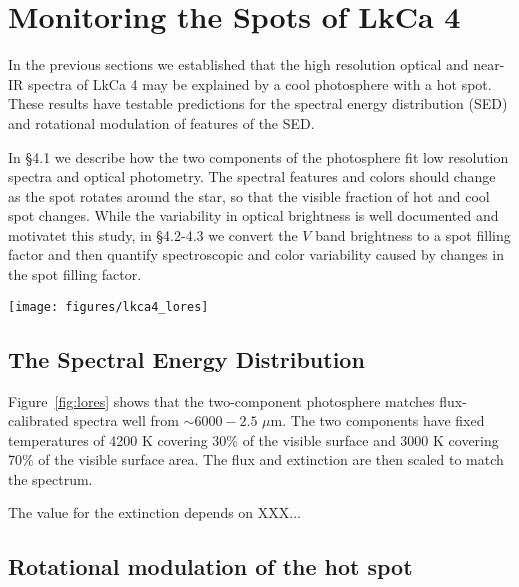 \documentclass[twocolumn]{emulateapj}%
\begin{document}




\section{Monitoring the Spots of LkCa 4}

In the previous sections we established that the high resolution optical and near-IR spectra of LkCa 4 may be explained by a cool photosphere with a hot spot.  These results have testable predictions for the spectral energy distribution (SED) and rotational modulation of features of the SED.


In \S 4.1 we describe how the two components of the photosphere fit low resolution spectra and optical photometry.  The spectral features and colors should change as the spot rotates around the star, so that the visible fraction of hot and cool spot changes.  While the variability in optical brightness is well documented and motivatet this study, in \S 4.2-4.3 we convert the $V$ band brightness to a spot filling factor and then quantify spectroscopic and color variability caused by changes in the spot filling factor.


\begin{figure*}
	\centering
	\texttt{[image: figures/lkca4\_lores]} 
	\caption{The low-resolution optical/near-IR spectrum of LkCa 4 is }
	\label{fig:lores}
\end{figure*}


\subsection{The Spectral Energy Distribution}

Figure~\ref{fig:lores} shows that the two-component photosphere matches flux-calibrated spectra well from $\sim 6000-2.5$ $\mu$m.  The two components have fixed temperatures of 4200 K covering 30\% of the visible surface and 3000 K covering 70\% of the visible surface area.  The flux and extinction are then scaled to match the spectrum.


The value for the extinction depends on XXX...





\subsection{Rotational modulation of the hot spot}
\end{document}
